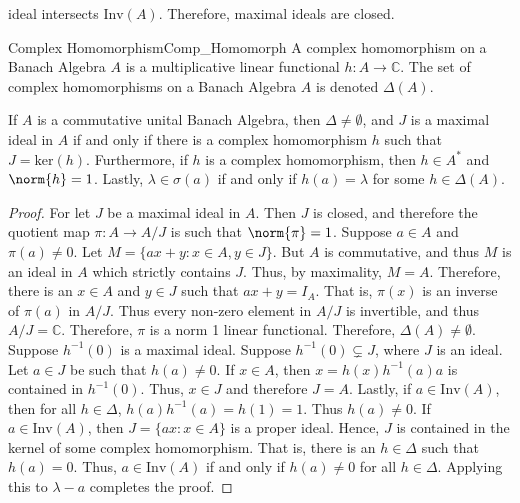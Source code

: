         ideal intersects $\mathrm{Inv}(A)$. Therefore, maximal
        ideals are closed.
        \begin{ldefinition}{Complex Homomorphism}{Comp_Homomorph}
            A complex homomorphism on a Banach Algebra $A$ is a
            multiplicative linear functional
            $h:A\rightarrow\mathbb{C}$. The set of complex
            homomorphisms on a Banach Algebra $A$ is denoted
            $\Delta(A)$.
        \end{ldefinition}
        \begin{theorem}
            If $A$ is a commutative unital Banach Algebra,
            then $\Delta\ne\emptyset$, and $J$ is a maximal
            ideal in $A$ if and only if there is a complex
            homomorphism $h$ such that $J=\mathrm{ker}(h)$.
            Furthermore, if $h$ is a complex homomorphism,
            then $h\in{A}^{*}$ and $\norm{h}=1$. Lastly,
            $\lambda\in\sigma(a)$ if and only if $h(a)=\lambda$
            for some $h\in\Delta(A)$.
        \end{theorem}
        \begin{proof}
            For let $J$ be a maximal ideal in $A$. Then $J$ is
            closed, and therefore the quotient map
            $\pi:A\rightarrow{A}/J$ is such that $\norm{\pi}=1$.
            Suppose $a\in{A}$ and $\pi(a)\ne{0}$. Let
            $M=\{ax+y:x\in{A},y\in{J}\}$. But $A$ is commutative,
            and thus $M$ is an ideal in $A$ which strictly
            contains $J$. Thus, by maximality, $M=A$. Therefore,
            there is an $x\in{A}$ and $y\in{J}$ such that
            $ax+y=I_{A}$. That is, $\pi(x)$ is an inverse of
            $\pi(a)$ in $A/J$. Thus every non-zero element in
            $A/J$ is invertible, and thus $A/J=\mathbb{C}$.
            Therefore, $\pi$ is a norm 1 linear functional.
            Therefore, $\Delta(A)\ne\emptyset$. Suppose
            $h^{\minus{1}}(0)$ is a maximal ideal.  Suppose
            $h^{\minus{1}}(0)\subsetneq{J}$, where $J$ is an
            ideal. Let $a\in{J}$ be such that $h(a)\ne{0}$. If
            $x\in{A}$, then $x=h(x)h^{\minus{1}}(a)a$ is
            contained in $h^{\minus{1}}(0)$. Thus, $x\in{J}$
            and therefore $J=A$. Lastly, if
            $a\in\mathrm{Inv}(A)$, then for all $h\in\Delta$,
            $h(a)h^{\minus{1}}(a)=h(1)=1$. Thus $h(a)\ne{0}$.
            If $a\in\mathrm{Inv}(A)$, then
            $J=\{ax:x\in{A}\}$ is a proper ideal. Hence,
            $J$ is contained in the kernel of some complex
            homomorphism. That is, there is an $h\in\Delta$ such
            that $h(a)=0$. Thus, $a\in\mathrm{Inv}(A)$ if and
            only if $h(a)\ne{0}$ for all $h\in\Delta$. Applying
            this to $\lambda-a$ completes the proof.
        \end{proof}
